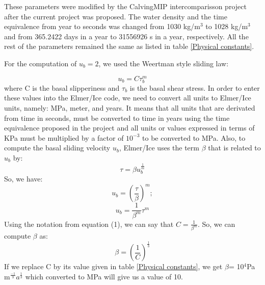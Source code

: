 \documentclass{article}
\begin{document}
These parameters were modified by the CalvingMIP intercomparisson project after the current project was proposed. The water density and the time equivalence from year to seconds was changed from 1030 kg/m$^3$ to 1028 kg/m$^3$ and from 365.2422 days in a year to 31556926 s in a year, respectively. All the rest of the parameters remained the same as listed in table \ref{Physical constants}.

For the computation of $u_b=2$, we used the Weertman style sliding law:

\begin{equation}
	u_b = C\tau _b^m
\end{equation}
where C is the basal slipperiness and $\tau _b$ is the basal shear stress.
In order to enter these values into the Elmer/Ice code, we need to convert all units to Elmer/Ice units, namely: MPa, meter, and years. It means that all units that are derivated from time in seconds, must be converted to time in years using the time equivalence proposed in the project and all units or values expressed in terms of KPa must be multiplied by a factor of $10^{-3}$ to be converted to MPa.
Also, to compute the basal sliding velocity $u_b$, Elmer/Ice uses the term $\beta$ that is related to $u_b$ by:
\begin{equation}
	\tau = \beta u_b^{\frac{1}{m}}
\end{equation}
So, we have:
\begin{equation}
	u_b = (\frac{\tau}{\beta})^m;
\end{equation}
\begin{equation}
	u_b = \frac{1}{\beta^m} \tau^m
\end{equation}
Using the notation from equation (1), we can say that $C=  \frac{1}{\beta^m}$. So, we can compute $\beta$ as:
\begin{equation}
	\beta=(\frac{1}{C})^{\frac{1}{3}}
\end{equation}
If we replace C by its value given in table \ref{Physical constants}, we get $\beta$= 10$^4$Pa m$^{\frac{-1}{3}} a^{\frac{1}{3}}$ which converted to MPa will give us a value of 10.
\end{document}
